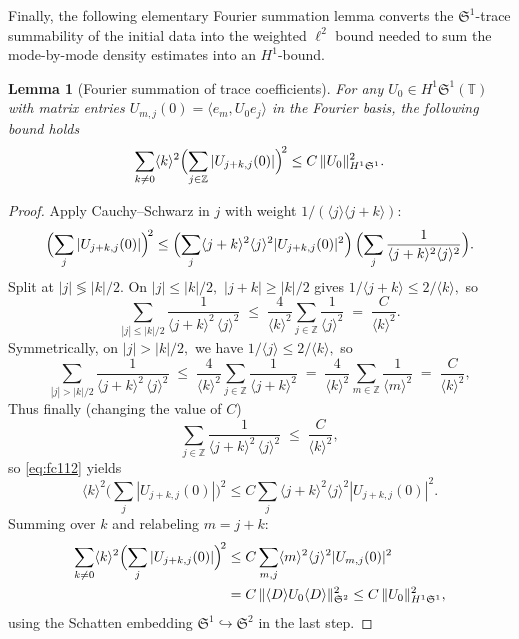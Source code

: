 \documentclass[11pt]{amsart}
\newtheorem{lemma}[theorem]{Lemma}
\theoremstyle{definition}
\newcommand{\T}{\mathbb{T}}
\newcommand{\Z}{\mathbb{Z}}
\newcommand{\Sp}{\mathfrak{S}}
\begin{document}
\medskip

Finally, the following elementary Fourier summation lemma converts the $\Sp^1$-trace summability of the initial data into the weighted $\ell^2$ bound needed to sum the mode-by-mode density estimates into an $H^1$-bound.

\begin{lemma}[Fourier summation of
trace coefficients]
\label{lem:fourier_sum}
For any $U_0\in H^1\Sp^1(\T)$ with matrix entries $U_{m,j}(0) =\langle e_m,U_0 e_j\rangle$ in the Fourier basis, the following bound holds
\begin{equation}\label{eq:fourier_sum_bound}
  \sum_{k\ne 0}\langle k\rangle^2
  \Bigl(\sum_{j\in\Z}
  |U_{j+k,j}(0)|\Bigr)^{\!2}
  \le C\,\|U_0\|_{H^1\Sp^1}^2.
\end{equation}
\end{lemma}

\begin{proof}
Apply Cauchy--Schwarz in $j$ with weight $1/(\langle j\rangle\langle j+k\rangle)$:
\begin{equation}\label{eq:fc112}
  \Bigl(\sum_j |U_{j+k,j}(0)|\Bigr)^{\!2}
  \le \Bigl(\sum_j \langle j+k\rangle^2
  \langle j\rangle^2|U_{j+k,j}(0)|^2\Bigr)\,
  \Bigl(\sum_j \frac{1}{\langle j+k\rangle^2
  \langle j\rangle^2}\Bigr).
\end{equation}
Split at $|j|\lessgtr|k|/2.$ On $|j|\le|k|/2,$ $|j+k|\ge|k|/2$ gives $1/\langle j+k\rangle\le2/\langle k\rangle,$ so
\[
  \sum_{|j|\le|k|/2}\frac{1}{\langle j+k\rangle^2\,\langle j\rangle^2}
  \;\le\; \frac{4}{\langle k\rangle^2}\sum_{j\in\Z}\frac{1}{\langle j\rangle^2}
  \;=\; \frac{C}{\langle k\rangle^2}.
\]
Symmetrically, on $|j|>|k|/2,$ we have $1/\langle j\rangle\le2/\langle k\rangle,$ so
\[
  \sum_{|j|>|k|/2}\frac{1}{\langle j+k\rangle^2\,\langle j\rangle^2}
  \;\le\; \frac{4}{\langle k\rangle^2}\sum_{j\in\Z}\frac{1}{\langle j+k\rangle^2}
  \;=\;\frac{4}{\langle k\rangle^2}\sum_{m\in\Z}\frac{1}{\langle m\rangle^2}
  \;=\; \frac{C}{\langle k\rangle^2},
\]
Thus finally (changing the value of $C$)
\[
  \sum_{j\in\Z}\frac{1}{\langle j+k\rangle^2\,\langle j\rangle^2}
  \;\le\; \frac{C}{\langle k\rangle^2},
\]
so \eqref{eq:fc112} yields 
\[
\langle k\rangle^2\bigl(\sum_j|U_{j+k,j}(0)|\bigr)^2 \le C\sum_j\langle j+k\rangle^2\langle j\rangle^2|U_{j+k,j}(0)|^2.
\]
Summing over $k$ and relabeling $m=j+k$:
\begin{align*}
  \sum_{k\ne 0}
  \langle k\rangle^2
  \Bigl(\sum_j|U_{j+k,j}(0)|\Bigr)^{\!2}
  &\le C\sum_{m,j}\langle m\rangle^2
  \langle j\rangle^2|U_{m,j}(0)|^2\\
  &= C\,\|\langle D\rangle U_0\langle D\rangle\|_{\Sp^2}^2
  \le C\,\|U_0\|_{H^1\Sp^1}^2,
\end{align*}
using the Schatten embedding $\Sp^1\hookrightarrow\Sp^2$ in the last step.
\end{proof}
\end{document}
